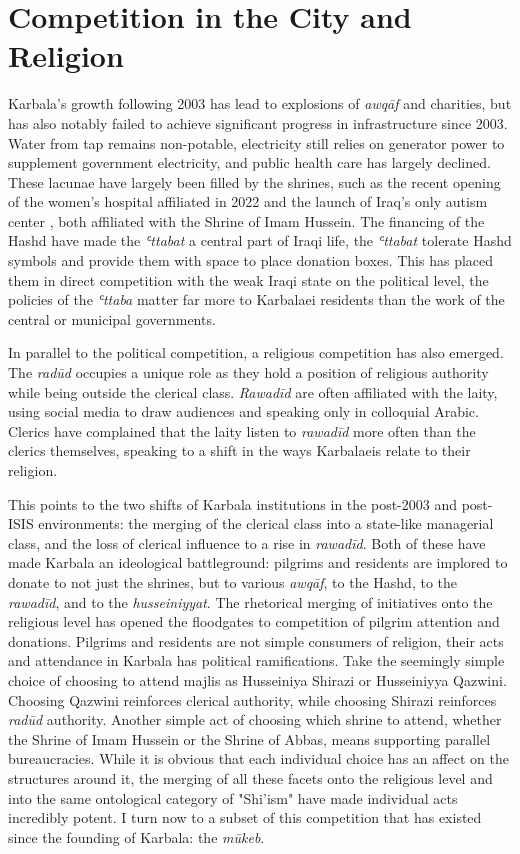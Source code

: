 \section{Competition in the City and Religion}
Karbala's growth following 2003 has lead to explosions of \emph{awqāf} and charities, but has also notably failed to achieve significant progress in infrastructure since 2003. Water from tap remains non-potable, electricity still relies on generator power to supplement government electricity, and public health care has largely declined. These lacunae have largely been filled by the shrines, such as the recent opening of the women's hospital affiliated in 2022 and the launch of Iraq's only autism center \cite{imam_hussain_holy_shrine_imam_2020}, both affiliated with the Shrine of Imam Hussein. The financing of the Hashd have made the \emph{ʿttabat} a central part of Iraqi life, the \emph{ʿttabat}  tolerate Hashd symbols and provide them with space to place donation boxes. This has placed them in direct competition with the weak Iraqi state on the political level, the policies of the \emph{ʿttaba} matter far more to Karbalaei residents than the work of the central or municipal governments. 

In parallel to the political competition, a religious competition has also emerged. The \emph{radūd} occupies a unique role as they hold a position of religious authority while being outside the clerical class. \emph{Rawadīd} are often affiliated with the laity, using social media to draw audiences and speaking only in colloquial Arabic. Clerics have complained that the laity listen to \emph{rawadīd} more often than the clerics themselves, speaking to a shift in the ways Karbalaeis relate to their religion. 

This points to the two shifts of Karbala institutions in the post-2003 and post-ISIS environments: the merging of the clerical class into a state-like managerial class, and the loss of clerical influence to a rise in \emph{rawadīd}. Both of these have made Karbala an ideological battleground: pilgrims and residents are implored to donate to not just the shrines, but to various \emph{awqāf}, to the Hashd, to the \emph{rawadīd}, and to the \emph{husseiniyyat}. The rhetorical merging of initiatives onto the religious level has opened the floodgates to competition of pilgrim attention and donations. Pilgrims and residents are not simple consumers of religion, their acts and attendance in Karbala has political ramifications. Take the seemingly simple choice of choosing to attend majlis as Husseiniya Shirazi or Husseiniyya Qazwini. Choosing Qazwini reinforces clerical authority, while choosing Shirazi reinforces \emph{radūd} authority. Another simple act of choosing which shrine to attend, whether the Shrine of Imam Hussein or the Shrine of Abbas, means supporting parallel bureaucracies. While it is obvious that each individual choice has an affect on the structures around it, the merging of all these facets onto the religious level and into the same ontological category of "Shi'ism" have made individual acts incredibly potent. I turn now to a subset of this competition that has existed since the founding of Karbala: the \emph{mūkeb}.